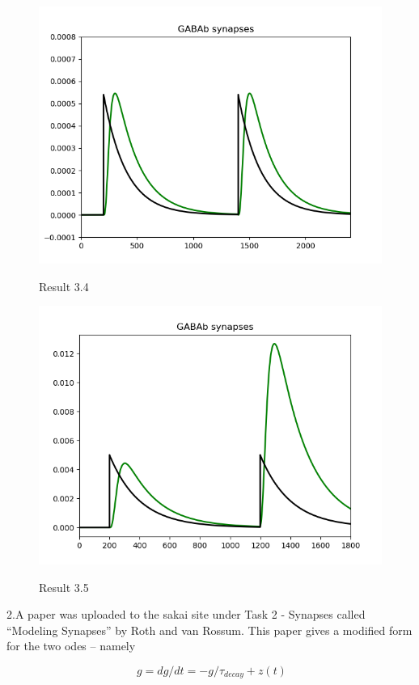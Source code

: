 \documentclass[12pt]{article}
\begin{document}
 \begin{figure}[H]
  \centering
        \includegraphics[width=.8\textwidth]{h2_p1_GABAb_2.png} %
  \label{img} %
  \caption{Result 3.4}

\end{figure}

 \begin{figure}[H]
  \centering
        \includegraphics[width=.8\textwidth]{h2_p1_GABAb.png} %
  \label{img} %
  \caption{Result 3.5}

\end{figure}

\newpage

2.A paper was uploaded to the sakai site under Task 2 - Synapses called “Modeling Synapses” by Roth and van Rossum. This paper gives a modified form for the two odes – namely 
 
$$ g= dg/dt =
−g/\tau_{decay}
+z(t)$$
 
\end{document}
